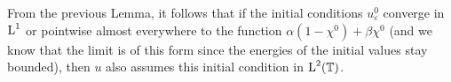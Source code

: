 \begin{remark}
	From the previous Lemma, it follows that if the initial conditions $ u_{ \varepsilon }^{ 0 } $ converge in $ \operatorname{L}^{ 1 } $ or pointwise almost everywhere to the function $ \alpha ( 1 - \chi^{ 0 } ) + \beta \chi^{ 0 } $ (and we know that the limit is of this form since the energies of the initial values stay bounded), then $ u $ also assumes this initial condition in $ \operatorname{L}^{ 2 } ( \operatorname{\mathbb{T}} ) $.
\end{remark}

